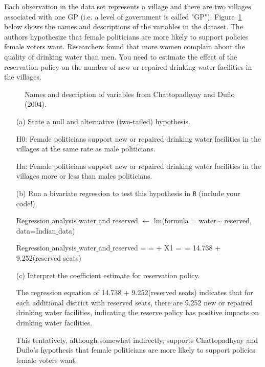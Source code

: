 \documentclass[12pt,letterpaper]{article}
\begin{document}
	\noindent Each observation in the data set represents a village and there are two villages associated with one GP (i.e. a level of government is called "GP"). Figure~\ref{fig:women_desc} below shows the names and descriptions of the variables in the dataset. The authors hypothesize that female politicians are more likely to support policies female voters want. Researchers found that more women complain about the quality of drinking water than men. You need to estimate the effect of the reservation policy on the number of new or repaired drinking water facilities in the villages.
	\vspace{.5cm}
	\begin{figure}[h!]
		\caption{\footnotesize{Names and description of variables from Chattopadhyay and Duflo (2004).}}
		\vspace{.5cm}
		\centering
		\label{fig:women_desc}
	\end{figure}		
	\begin{enumerate}
		\item [(a)] State a null and alternative (two-tailed) hypothesis. 
		
		H0: Female politicians support new or repaired drinking water facilities in the villages at the same rate as male politicians.
		
		Ha: Female politicians support new or repaired drinking water facilities in the villages more or less than males politicians.
	
	\vspace{2cm}
		\item [(b)] Run a bivariate regression to test this hypothesis in \texttt{R} (include your code!).
		
		Regression$\_$analysis$\_$water$\_$and$\_$reserved $\gets$ lm(formula = water$\sim$ reserved, data=Indian$\_$data)
		
		Regression$\_$analysis$\_$water$\_$and$\_$reserved =  =  + X1 =~= 14.738 + 9.252(reserved seats)
	
	\vspace{2cm}
		\item [(c)] Interpret the coefficient estimate for reservation policy.
		 
		The regression equation of 14.738 + 9.252(reserved seats) indicates that for each additional district with reserved seats, there are 9.252 new or repaired drinking water facilities, indicating the reserve policy has positive impacts on drinking water facilities.
		
		This tentatively, although somewhat indirectly, supports Chattopadhyay and Duflo's hypothesis that female politicians are more likely to support policies female voters want.
	\end{enumerate}
	
\end{document}
